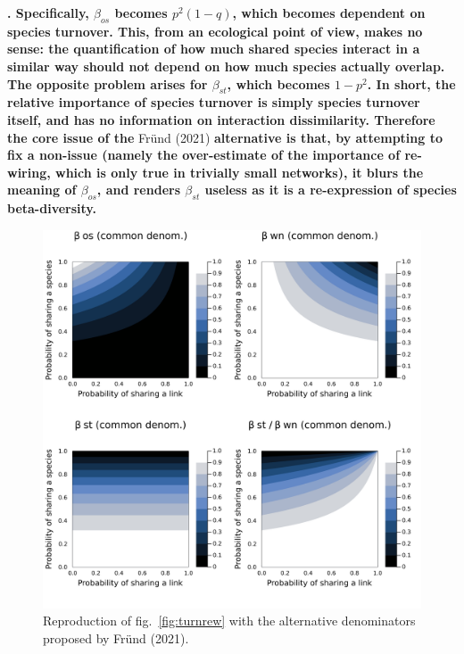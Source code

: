 \documentclass[11pt]{article}
\makeatletter
\def\maxwidth{\ifdim\Gin@nat@width>\linewidth\linewidth
\else\Gin@nat@width\fi}
\let\Oldincludegraphics\includegraphics
\renewcommand{\includegraphics}[1]{\Oldincludegraphics[width=\maxwidth]{#1}}
\providecommand{\DIFaddtex}[1]{{\bf #1}} %
\providecommand{\DIFdeltex}[1]{} %
\providecommand{\DIFaddbegin}{\protect\color{blue}} %
\providecommand{\DIFaddend}{\protect\color{black}} %
\providecommand{\DIFdelbegin}{\protect\color{red}} %
\providecommand{\DIFdelend}{\protect\color{black}} %
\providecommand{\DIFadd}[1]{\texorpdfstring{\DIFaddtex{#1}}{#1}} %
\providecommand{\DIFdel}[1]{\texorpdfstring{\DIFdeltex{#1}}{}} %
\newcommand{\DIFscaledelfig}{0.5}
\newlength{\DIFdelgraphicswidth} %
\newlength{\DIFdelgraphicsheight} %
\newcommand{\DIFaddincludegraphics}[2][]{{\color{blue}\fbox{\DIFOincludegraphics[#1]{#2}}}} %
\newcommand{\DIFdelincludegraphics}[2][]{%
\sbox{\DIFdelgraphicsbox}{\DIFOincludegraphics[#1]{#2}}%
\settoboxwidth{\DIFdelgraphicswidth}{\DIFdelgraphicsbox} %
\settoboxtotalheight{\DIFdelgraphicsheight}{\DIFdelgraphicsbox} %
\scalebox{\DIFscaledelfig}{%
\parbox[b]{\DIFdelgraphicswidth}{\usebox{\DIFdelgraphicsbox}\\[-\baselineskip] \rule{\DIFdelgraphicswidth}{0em}}\llap{\resizebox{\DIFdelgraphicswidth}{\DIFdelgraphicsheight}{%
\setlength{\unitlength}{\DIFdelgraphicswidth}%
\begin{picture}(1,1)%
\thicklines\linethickness{2pt} %
{\color[rgb]{1,0,0}\put(0,0){\framebox(1,1){}}}%
{\color[rgb]{1,0,0}\put(0,0){\line( 1,1){1}}}%
{\color[rgb]{1,0,0}\put(0,1){\line(1,-1){1}}}%
\end{picture}%
}\hspace*{3pt}}} %
} %
\DeclareRobustCommand{\DIFaddbegin}{\DIFOaddbegin \let\includegraphics\DIFaddincludegraphics} %
\DeclareRobustCommand{\DIFaddend}{\DIFOaddend \let\includegraphics\DIFOincludegraphics} %
\DeclareRobustCommand{\DIFdelbegin}{\DIFOdelbegin \let\includegraphics\DIFdelincludegraphics} %
\DeclareRobustCommand{\DIFdelend}{\DIFOaddend \let\includegraphics\DIFOincludegraphics} %
\makeatother
\begin{document}
\DIFdel{It is
essential to recognize that there are multiple reasons to
calculate network dissimilarity, and it is our opinion that the arguments levied by }\DIFdelend \DIFaddbegin \DIFadd{. Specifically, \(\beta_{os}\) becomes \(p^2(1-q)\), which
becomes dependent on species turnover. This, from an ecological point of
view, makes no sense: the quantification of how much shared species
interact in a similar way should not depend on how much species actually
overlap. The opposite problem arises for \(\beta_{st}\), which becomes
\(1-p^2\). In short, the relative importance of species turnover is
simply species turnover itself, and has no information on interaction
dissimilarity. Therefore the core issue of the }\DIFaddend Fründ (2021) \DIFdelbegin \DIFdel{against the original partition stem
from a misunderstanding of what it intends to do (and does, indeed, do
well), not from intrinsic methodological issues in the partition itself.
}\DIFdelend \DIFaddbegin \DIFadd{alternative
is that, by attempting to fix a non-issue (namely the over-estimate of
the importance of re-wiring, which is only true in trivially small
networks), it blurs the meaning of \(\beta_{os}\), and renders
\(\beta_{st}\) useless as it is a re-expression of species
beta-diversity.
}

\begin{figure}
\hypertarget{fig:commden}{%
\centering
\includegraphics{figures/common_denominator/components.png}
\caption{Reproduction of fig.~\ref{fig:turnrew} with the alternative
denominators proposed by Fründ (2021).}\label{fig:commden}
}

\end{figure}
\end{document}
